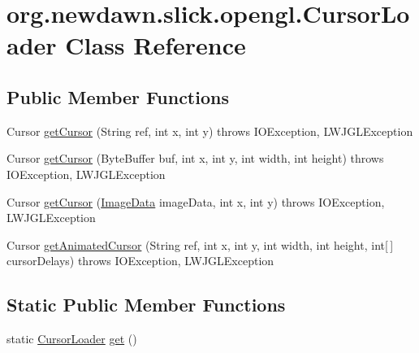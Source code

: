 \hypertarget{classorg_1_1newdawn_1_1slick_1_1opengl_1_1_cursor_loader}{}\section{org.\+newdawn.\+slick.\+opengl.\+Cursor\+Loader Class Reference}
\label{classorg_1_1newdawn_1_1slick_1_1opengl_1_1_cursor_loader}
\subsection*{Public Member Functions}
\begin{DoxyCompactItemize}
\item 
Cursor \mbox{\hyperlink{classorg_1_1newdawn_1_1slick_1_1opengl_1_1_cursor_loader_ac4f0e812a577dac3ec62798e502a537f}{get\+Cursor}} (String ref, int x, int y)  throws I\+O\+Exception, L\+W\+J\+G\+L\+Exception 
\item 
Cursor \mbox{\hyperlink{classorg_1_1newdawn_1_1slick_1_1opengl_1_1_cursor_loader_a12f03f9c48a6ce9d08e8fb7e0dbb0e44}{get\+Cursor}} (Byte\+Buffer buf, int x, int y, int width, int height)  throws I\+O\+Exception, L\+W\+J\+G\+L\+Exception 
\item 
Cursor \mbox{\hyperlink{classorg_1_1newdawn_1_1slick_1_1opengl_1_1_cursor_loader_af11a55cc66ccb52ecb4f9ded039852d6}{get\+Cursor}} (\mbox{\hyperlink{interfaceorg_1_1newdawn_1_1slick_1_1opengl_1_1_image_data}{Image\+Data}} image\+Data, int x, int y)  throws I\+O\+Exception, L\+W\+J\+G\+L\+Exception 
\item 
Cursor \mbox{\hyperlink{classorg_1_1newdawn_1_1slick_1_1opengl_1_1_cursor_loader_af5c88d9adc8a074148976143c1e6ca4f}{get\+Animated\+Cursor}} (String ref, int x, int y, int width, int height, int\mbox{[}$\,$\mbox{]} cursor\+Delays)  throws I\+O\+Exception, L\+W\+J\+G\+L\+Exception 
\end{DoxyCompactItemize}
\subsection*{Static Public Member Functions}
\begin{DoxyCompactItemize}
\item 
static \mbox{\hyperlink{classorg_1_1newdawn_1_1slick_1_1opengl_1_1_cursor_loader}{Cursor\+Loader}} \mbox{\hyperlink{classorg_1_1newdawn_1_1slick_1_1opengl_1_1_cursor_loader_acbc2feefd76526fce430c5e935831f7e}{get}} ()
\end{DoxyCompactItemize}
